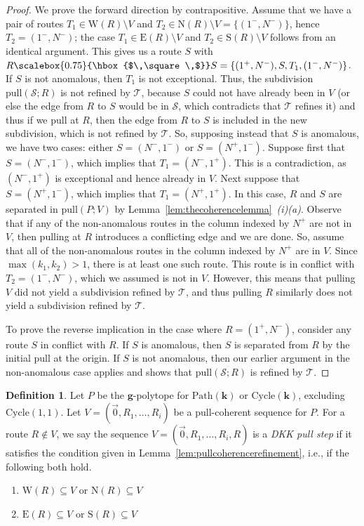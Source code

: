 \documentclass[12pt]{amsart}
\theoremstyle{definition}
\newtheorem{definition}[theorem]{Definition}
\newcommand{\defn}[1]{\emph{\color{blue} #1}}
\newcommand\bg{\mathbf{g}}
\newcommand\bk{\mathbf{k}}
\newcommand\calS{\mathcal{S}}
\newcommand\calT{\mathcal{T}}
\newcommand\pull{\mathrm{pull}}
\newcommand\Path{\mathrm{Path}}
\newcommand\Cycle{\mathrm{Cycle}}
\newcommand\north{\mathrm{N}}
\newcommand\south{\mathrm{S}}
\newcommand\east{\mathrm{E}}
\newcommand\west{\mathrm{W}}
\newcommand\squarette{\scalebox{0.75}{\hbox{$\,\square\,$}}}
\begin{document}
\begin{proof}
    We prove the forward direction by contrapositive. 
    Assume that we have a pair of routes $T_1\in \west(R)\setminus V$ and $T_2\in \north(R) \setminus V=\{(1^-,N^-)\}$, hence $T_2=(1^-,N^-)$; the case $T_1\in \east(R)\setminus V$ and $T_2\in \south(R) \setminus V$ follows from an identical argument. 
    This gives us a route $S$ with $R\squarette S = \{(1^+,N^-),S,T_1, (1^-,N^-)\}$. 
    If $S$ is not anomalous, then $T_1$ is not exceptional.
    Thus, the subdivision $\pull(\calS;R)$ is not refined by $\calT$, because $S$ could not have already been in $V$ (or else the edge from $R$ to $S$ would be in $\calS$, which contradicts that $\calT$ refines it) and thus if we pull at $R$, then the edge from $R$ to $S$ is included in the new subdivision, which is not refined by $\calT$.
    So, supposing instead that $S$ is anomalous, we have two cases: either $S=(N^-,1^-)$ or $S=(N^+,1^-)$.
    Suppose first that $S=(N^-,1^-)$, which implies that $T_1=(N^-,1^+)$.
    This is a contradiction, as $(N^-,1^+)$ is exceptional and hence already in $V$.
    Next suppose that $S=(N^+,1^-)$, which implies that $T_1=(N^+,1^+)$.
    In this case, $R$ and $S$ are separated in $\pull(P;V)$ by Lemma~\ref{lem:thecoherencelemma}~\textit{(i)(a)}.
    Observe that if any of the non-anomalous routes in the column indexed by $N^+$ are not in $V$, then pulling at $R$ introduces a conflicting edge and we are done.
    So, assume that all of the non-anomalous routes in the column indexed by $N^+$ are in $V$.
    Since $\max(k_1,k_2)>1$, there is at least one such route.
    This route is in conflict with $T_2=(1^-,N^-)$, which we assumed is not in $V$.
    However, this means that pulling $V$ did not yield a subdivision refined by $\calT$, and thus pulling $R$ similarly does not yield a subdivision refined by $\calT$.
    
    To prove the reverse implication in the case where $R= (1^+, N^-)$, consider any route $S$ in conflict with $R$. 
    If $S$ is anomalous, then $S$ is separated from $R$ by the initial pull at the origin. If $S$ is not anomalous, then our earlier argument in the non-anomalous case applies and shows that $\pull(\calS;R)$ is refined by $\calT$.
\end{proof}

\begin{definition}
    \label{def:dkkpullstep}
    Let $P$ be the $\bg$-polytope for $\Path(\bk)$ or $\Cycle(\bk)$, excluding $\Cycle(1,1)$.
    Let $V=(\vec{0},R_1,\dots, R_i)$ be a pull-coherent sequence for $P$.
    For a route $R\notin V$, we say the sequence $V=(\vec{0},R_1,\dots, R_i,R)$ is a \defn{DKK pull step} if it satisfies the condition given in Lemma~\ref{lem:pullcoherencerefinement}, i.e., if the following both hold.
    \begin{enumerate}[label=\alph*)]
         \item $\west(R)\subseteq V$ or $\north(R)\subseteq V$
         \item $\east(R)\subseteq V$ or $\south(R)\subseteq V$
     \end{enumerate}  
\end{definition}
\end{document}
